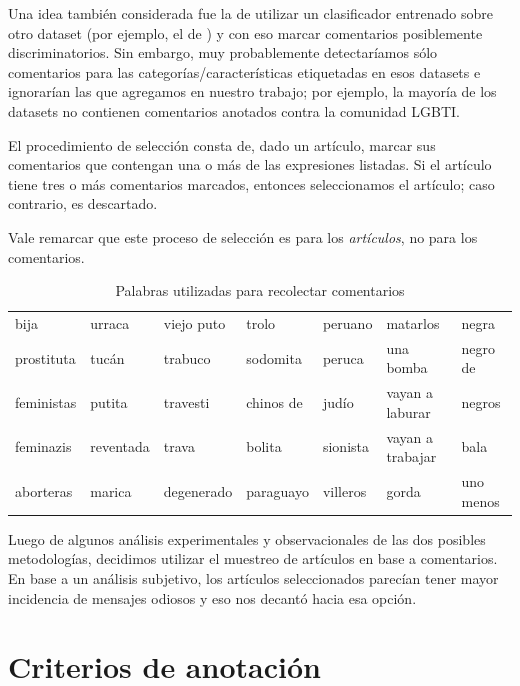 Una idea también considerada fue la de utilizar un clasificador entrenado sobre otro dataset (por ejemplo, el de \citet{hateval2019semeval}) y con eso marcar comentarios posiblemente discriminatorios. Sin embargo, muy probablemente detectaríamos sólo comentarios para las categorías/características etiquetadas en esos datasets e ignorarían las que agregamos en nuestro trabajo; por ejemplo, la mayoría de los datasets no contienen comentarios anotados contra la comunidad LGBTI.

El procedimiento de selección consta de, dado un artículo, marcar sus comentarios que contengan una o más de las expresiones listadas. Si el artículo tiene tres o más comentarios marcados, entonces seleccionamos el artículo; caso contrario, es descartado.


Vale remarcar que este proceso de selección es para los \emph{artículos}, no para los comentarios.

\begin{table}[t!]
    \centering
    \begin{tabular}{l|l|l|l|l|l|l}
    bija          & urraca     & viejo puto    & trolo      & peruano  & matarlos         & negra      \\
    prostituta    & tucán      & trabuco       & sodomita   & peruca   & una bomba        & negro de   \\
    feministas    & putita     & travesti      & chinos de  & judío    & vayan a laburar  & negros     \\
    feminazis     & reventada  & trava         & bolita     & sionista & vayan a trabajar & bala       \\
    aborteras     & marica     & degenerado    & paraguayo  & villeros & gorda            & uno menos  \\
    \end{tabular}
    \caption{Palabras utilizadas para recolectar comentarios}
    \label{tab:palabras_comentarios}
\end{table}

Luego de algunos análisis experimentales y observacionales de las dos posibles metodologías, decidimos utilizar el muestreo de artículos en base a comentarios. En base a un análisis subjetivo, los artículos seleccionados parecían tener mayor incidencia de mensajes odiosos y eso nos decantó hacia esa opción.

\section{Criterios de anotación}
\label{sec:criterios}


